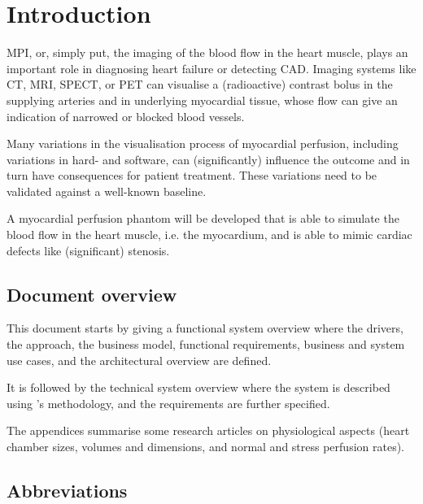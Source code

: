 \chapter{Introduction}
\label{ch:Intro}

\Ac{MPI}, or, simply put, the imaging of the blood flow in the heart muscle, plays an important role in diagnosing heart failure or detecting \ac{CAD}. Imaging systems like \ac{CT}, \ac{MRI}, \ac{SPECT}, or \ac{PET} can visualise a (radioactive) contrast bolus in the supplying arteries and in underlying myocardial tissue, whose flow can give an indication of narrowed or blocked blood vessels.

Many variations in the visualisation process of myocardial perfusion, including variations in hard- and software, can (significantly) influence the outcome and in turn have consequences for patient treatment. These variations need to be validated against a well-known baseline.

A myocardial perfusion phantom will be developed that is able to simulate the blood flow in the heart muscle, i.e. the myocardium, and is able to mimic cardiac defects like (significant) stenosis.

\section*{Document overview}
\label{sec:doc_overview}
This document starts by giving a functional system overview where the drivers, the approach, the business model, functional requirements, business and system use cases, and the architectural overview are defined. 

It is followed by the technical system overview where the system is described using \cite{van2011modeling}'s methodology, and the requirements are further specified.

The appendices summarise some research articles on physiological aspects (heart chamber sizes, volumes and dimensions, and normal and stress perfusion rates).

\section*{Abbreviations}
\begin{multicols}{2}
	\printacronyms[include-classes=abbrev, name=Abbreviations, heading=none]
\end{multicols}